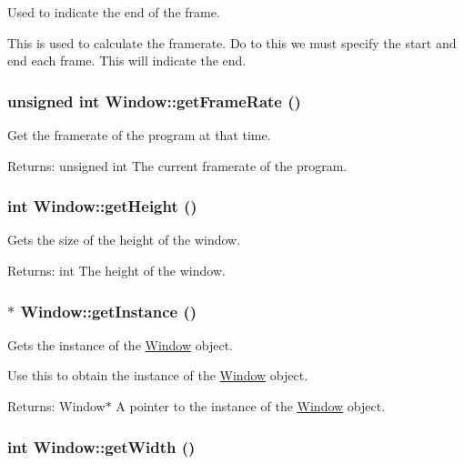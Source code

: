 Used to indicate the end of the frame. 

This is used to calculate the framerate. Do to this we must specify the start and end each frame. This will indicate the end. \hypertarget{class_window_452c0d55dc623f2092b5fbe60c7b7644}{
\subsubsection[{getFrameRate}]{\setlength{\rightskip}{0pt plus 5cm}unsigned int Window::getFrameRate ()}}
\label{class_window_452c0d55dc623f2092b5fbe60c7b7644}


Get the framerate of the program at that time. 

\begin{Desc}
\item[Returns:]unsigned int The current framerate of the program. \end{Desc}
\hypertarget{class_window_02acaaf02d8b63d4bd74d99482fe3a78}{
\subsubsection[{getHeight}]{\setlength{\rightskip}{0pt plus 5cm}int Window::getHeight ()}}
\label{class_window_02acaaf02d8b63d4bd74d99482fe3a78}


Gets the size of the height of the window. 

\begin{Desc}
\item[Returns:]int The height of the window. \end{Desc}
\hypertarget{class_window_9168e673f5c1866c4b1b41be425e88d6}{
\subsubsection[{getInstance}]{ $\ast$ Window::getInstance ()}}
\label{class_window_9168e673f5c1866c4b1b41be425e88d6}


Gets the instance of the \hyperlink{class_window}{Window} object. 

Use this to obtain the instance of the \hyperlink{class_window}{Window} object. \begin{Desc}
\item[Returns:]Window$\ast$ A pointer to the instance of the \hyperlink{class_window}{Window} object. \end{Desc}
\hypertarget{class_window_2d459fe21a48b6a41834a32a6c84fe2e}{
\subsubsection[{getWidth}]{\setlength{\rightskip}{0pt plus 5cm}int Window::getWidth ()}}
\label{class_window_2d459fe21a48b6a41834a32a6c84fe2e}


